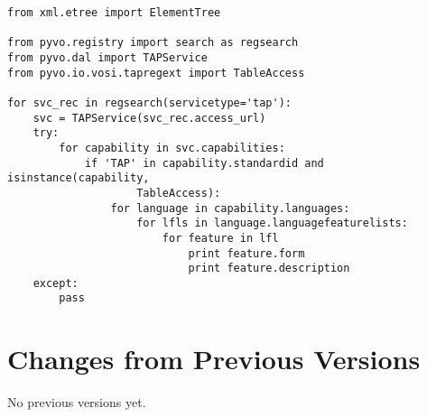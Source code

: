\documentclass[11pt,a4paper]{ivoa}
\begin{document}
\begin{lstlisting}
from xml.etree import ElementTree

from pyvo.registry import search as regsearch
from pyvo.dal import TAPService
from pyvo.io.vosi.tapregext import TableAccess

for svc_rec in regsearch(servicetype='tap'):
    svc = TAPService(svc_rec.access_url)
    try: 
        for capability in svc.capabilities:
            if 'TAP' in capability.standardid and isinstance(capability,
                    TableAccess):
                for language in capability.languages:
                    for lfls in language.languagefeaturelists:
                        for feature in lfl
                            print feature.form
                            print feature.description
    except:
        pass
\end{lstlisting}

\section{Changes from Previous Versions}

No previous versions yet.  



\end{document}

